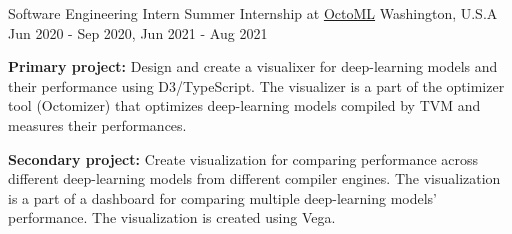 

\begin{cventries}

  \cventry
    {Software Engineering Intern} %
    {Summer Internship at \href{https://octoml.ai/}{OctoML}} %
    {Washington, U.S.A} %
    {Jun 2020 - Sep 2020, Jun 2021 - Aug 2021} %
    {
      \begin{cvitems} %
        \item {
          \textbf{Primary project:} Design and create a visualixer for deep-learning models and their performance using D3/TypeScript.
          The visualizer is a part of the optimizer tool (Octomizer) that optimizes deep-learning models compiled by TVM and measures their performances.
        }
        \item {
          \textbf{Secondary project:} Create visualization for comparing performance across different deep-learning models from different compiler engines.
          The visualization is a part of a dashboard for comparing multiple deep-learning models' performance.
          The visualization is created using Vega.
        }
      \end{cvitems}
    }


\end{cventries}
